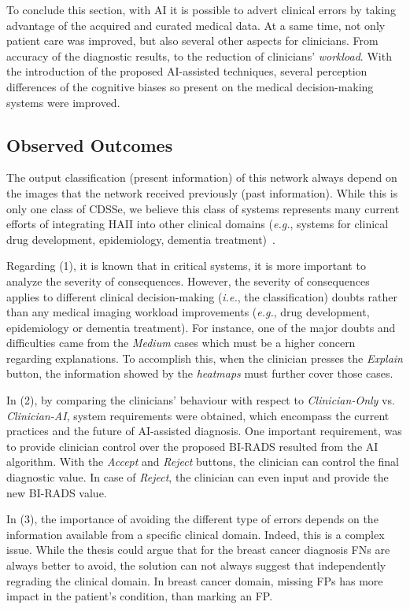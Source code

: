 To conclude this section, with \ac{AI} it is possible to advert clinical errors by taking advantage of the acquired and curated medical data.
At a same time, not only patient care was improved, but also several other aspects for clinicians.
From accuracy of the diagnostic results, to the reduction of clinicians' {\it workload}.
With the introduction of the proposed \ac{AI}-assisted techniques, several perception differences of the cognitive biases so present on the medical decision-making systems were improved.

\subsection{Observed Outcomes}
\label{sec:app002005003}

The output classification (present information) of this network always depend on the images that the network received previously (past information).
While this is only one class of \ac{CDSSe}, we believe this class of systems represents many current efforts of integrating \ac{HAII} into other clinical domains ({\it e.g.}, systems for clinical drug development, epidemiology, dementia treatment)~\cite{Savage2019, shah2019artificial, topol2019high}.

Regarding (1), it is known that in critical systems, it is more important to analyze the severity of consequences.
However, the severity of consequences applies to different clinical decision-making ({\it i.e.}, the classification) doubts rather than any medical imaging workload improvements ({\it e.g.}, drug development, epidemiology or dementia treatment).
For instance, one of the major doubts and difficulties came from the {\it Medium} cases which must be a higher concern regarding explanations.
To accomplish this, when the clinician presses the {\it Explain} button, the information showed by the {\it heatmaps} must further cover those cases.

In (2), by comparing the clinicians' behaviour with respect to {\it Clinician-Only} vs. {\it Clinician-AI}, system requirements were obtained, which encompass the current practices and the future of \ac{AI}-assisted diagnosis.
One important requirement, was to provide clinician control over the proposed \ac{BI-RADS} resulted from the \ac{AI} algorithm.
With the {\it Accept} and {\it Reject} buttons, the clinician can control the final diagnostic value.
In case of {\it Reject}, the clinician can even input and provide the new \ac{BI-RADS} value.

In (3), the importance of avoiding the different type of errors depends on the information available from a specific clinical domain.
Indeed, this is a complex issue.
While the thesis could argue that for the breast cancer diagnosis \acp{FN} are always better to avoid, the solution can not always suggest that independently regrading the clinical domain.
In breast cancer domain, missing \acp{FP} has more impact in the patient's condition, than marking an \ac{FP}.  


